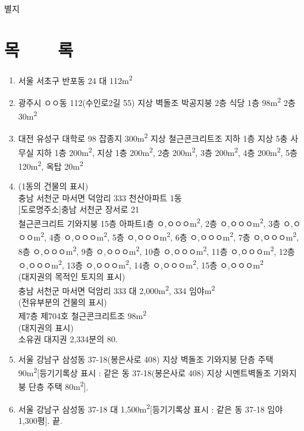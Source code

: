 \documentclass[12pt]{oblivoir}
\begin{document}
\newpage
{}
별지
\vspace{5em}
\chapter*{\normalfont\normalsize 목~~~~록}
\begin{enumerate}
\item 서울 서초구 반포동 24 대 112\si{\square\metre}\\ %
\item 광주시 ㅇㅇ동 112(수인로2길 55) 지상 벽돌조 박공지붕 2층 식당 1층 98\si{\square\metre} 2층 30\si{\metre\squared}\\ %
\item 대전 유성구 대학로 98 잡종지 300\si{\square\metre} 지상 철근콘크리트조 지하 1층 지상 5충 사무실 지하 1층 200\si{\square\metre}, 지상 1층 200\si{\square\metre}, 2층 200\si{\metre\squared}, 3층 200\si{\square\metre}, 4층 200\si{\square\metre}, 5층 120\si{\metre\squared}, 옥탑 20\si{\square\metre}\\ %
\item (1동의 건물의 표시)\\ %
  충남 서천군 마서면 덕암리 333 천산아파트 1동\\
  {[도로명주소]}충남 서천군 장서로 21\\
  철근콘크리트 기와지붕 15층 아파트1층 ㅇ,ㅇㅇㅇ\si{\square\metre}, 2층 ㅇ,ㅇㅇㅇ\si{\square\metre}, 3층 ㅇ,ㅇㅇㅇ\si{\square\metre}, 4층 ㅇ,ㅇㅇㅇ\si{\square\metre}, 5층 ㅇ,ㅇㅇㅇ\si{\square\metre}, 6층 ㅇ,ㅇㅇㅇ\si{\square\metre}, 7층 ㅇ,ㅇㅇㅇ\si{\square\metre}, 8층 ㅇ,ㅇㅇㅇ\si{\square\metre}, 9층 ㅇ,ㅇㅇㅇ\si{\square\metre}, 10층 ㅇ,ㅇㅇㅇ\si{\square\metre}, 11층 ㅇ,ㅇㅇㅇ\si{\square\metre}, 12층 ㅇ,ㅇㅇㅇ\si{\square\metre}, 13층 ㅇ,ㅇㅇㅇ\si{\square\metre}, 14층 ㅇ,ㅇㅇㅇ\si{\square\metre}, 15층 ㅇ,ㅇㅇㅇ\si{\square\metre}\\
  (대지권의 목적인 토지의 표시)\\
  충남 서천군 마서면 덕암리 333 대 2,000\si{\square\metre}, 334 임야\si{\square\metre}\\
  (전유부분의 건물의 표시)\\
  제7층 제704호 철근콘크리트조 98\si{\square\metre}\\
  (대지권의 표시)\\
  소유권 대지권 2,334분의 80.
\item 서울 강남구 삼성동 37-18(봉은사로 408) 지상 벽돌조 기와지붕 단층 주택 90\si{\square\metre}{[등기기록상 표시 : 같은 동 37-18(봉은사로 408) 지상 시멘트벽돌조 기와지붕 단층 주택 80\si{\square\metre}]}. %
  \item 서울 강남구 삼성동 37-18 대 1,500\si{\metre\squared}{[등기기록상 표시 : 같은 동 37-18 임야 1,300평]}. 끝. %
\end{enumerate}
\end{document}
